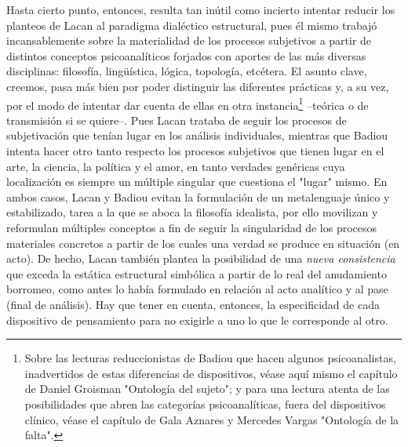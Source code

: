 \documentclass{book}
\begin{document}
Hasta cierto punto, entonces, resulta tan inútil como incierto intentar
reducir los planteos de Lacan al paradigma dialéctico estructural, pues
él mismo trabajó incansablemente sobre la materialidad de los procesos
subjetivos a partir de distintos conceptos psicoanalíticos forjados con
aportes de las más diversas disciplinas: filosofía, lingüística, lógica,
topología, etcétera. El asunto clave, creemos, pasa más bien por poder
distinguir las diferentes prácticas y, a su vez, por el modo de intentar
dar cuenta de ellas en otra instancia\footnote{Sobre las lecturas
  reduccionistas de Badiou que hacen algunos psicoanalistas,
  inadvertidos de estas diferencias de dispositivos, véase aquí mismo el
  capítulo de Daniel Groisman "Ontología del sujeto"; y para una lectura
  atenta de las posibilidades que abren las categorías psicoanalíticas,
  fuera del dispositivos clínico, véase el capítulo de Gala Aznares y
  Mercedes Vargas "Ontología de la falta".} --teórica o de transmisión
si se quiere--. Pues Lacan trataba de seguir los procesos de
subjetivación que tenían lugar en los análisis individuales, mientras
que Badiou intenta hacer otro tanto respecto los procesos subjetivos que
tienen lugar en el arte, la ciencia, la política y el amor, en tanto
verdades genéricas cuya localización es siempre un múltiple singular que
cuestiona el "lugar" mismo. En ambos casos, Lacan y Badiou evitan la
formulación de un metalenguaje único y estabilizado, tarea a la que se
aboca la filosofía idealista, por ello movilizan y reformulan múltiples
conceptos a fin de seguir la singularidad de los procesos materiales
concretos a partir de los cuales una verdad se produce en situación (en
acto). De hecho, Lacan también plantea la posibilidad de una \emph{nueva
consistencia} que exceda la estática estructural simbólica a partir de
lo real del anudamiento borromeo, como antes lo había formulado en
relación al acto analítico y al pase (final de análisis). Hay que tener
en cuenta, entonces, la especificidad de cada dispositivo de pensamiento
para no exigirle a uno lo que le corresponde al otro.
\end{document}
